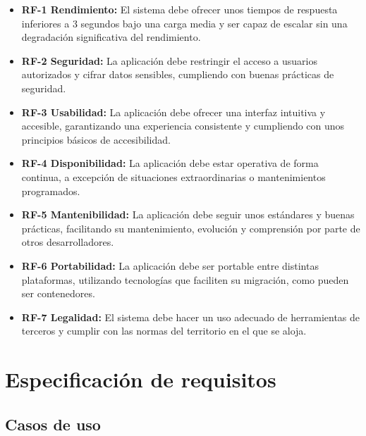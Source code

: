 \begin{itemize}
	\tightlist
	\item \textbf{RF-1 Rendimiento:} El sistema debe ofrecer unos tiempos de respuesta inferiores a 3 segundos bajo una carga media y ser capaz de escalar sin una degradación significativa del rendimiento.
	\item \textbf{RF-2 Seguridad:} La aplicación debe restringir el acceso a usuarios autorizados y cifrar datos sensibles, cumpliendo con buenas prácticas de seguridad.
	\item \textbf{RF-3 Usabilidad:} La aplicación debe ofrecer una interfaz intuitiva y accesible, garantizando una experiencia consistente y cumpliendo con unos principios básicos de accesibilidad.
	\item \textbf{RF-4 Disponibilidad:} La aplicación debe estar operativa de forma continua, a excepción de situaciones extraordinarias o mantenimientos programados.
	\item \textbf{RF-5 Mantenibilidad:} La aplicación debe seguir unos estándares y buenas prácticas, facilitando su mantenimiento, evolución y comprensión por parte de otros desarrolladores.
	\item \textbf{RF-6 Portabilidad:} La aplicación debe ser portable entre distintas plataformas, utilizando tecnologías que faciliten su migración, como pueden ser contenedores.
	\item \textbf{RF-7 Legalidad:} El sistema debe hacer un uso adecuado de herramientas de terceros y cumplir con las normas del territorio en el que se aloja.
\end{itemize}

\section{Especificación de requisitos}\label{sec:especificacion-de-requisitos}

\subsection{Casos de uso}\label{subsec:casos-de-uso}

